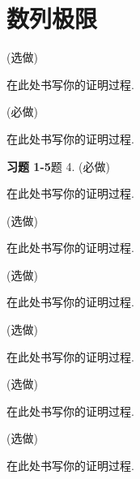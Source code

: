 \documentclass[answers, 10pt]{exam}
\begin{document}
\newpage

\section{数列极限}

\begin{questions}
	
	 (选做)
	
	\begin{solution}
		在此处书写你的证明过程.
	\end{solution}
	
	 (必做)
	
	\begin{solution}
		在此处书写你的证明过程.
	\end{solution}
	
	 {\bf 习题 1-5}{题 4.} (必做)
	
	\begin{solution}
		在此处书写你的证明过程.
	\end{solution}
	
	 (选做)
	
	\begin{solution}
		在此处书写你的证明过程.
	\end{solution}
	
	 (选做)
	
	\begin{solution}
		在此处书写你的证明过程.
	\end{solution}
	
	 (选做)
	
	\begin{solution}
		在此处书写你的证明过程.
	\end{solution}
	
	 (选做)
	
	\begin{solution}
		在此处书写你的证明过程.
	\end{solution}
	
	 (选做)
	
	\begin{solution}
		在此处书写你的证明过程.
	\end{solution}
	
\end{questions}
\end{document}
